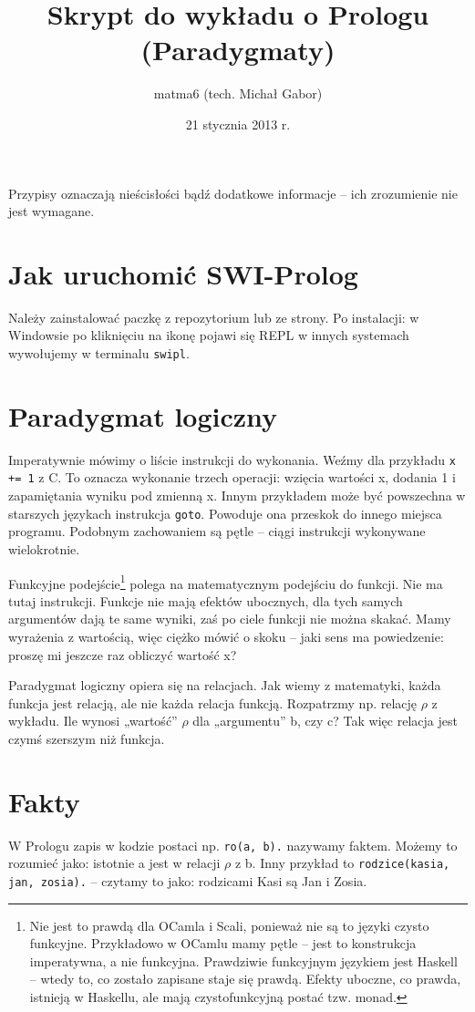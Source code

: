 \documentclass[12pt,a4paper]{article}
\author{matma6 (tech. Michał Gabor)}
\title{Skrypt do wykładu o Prologu (Paradygmaty)}
\date{21 stycznia 2013 r.}
\begin{document}
\maketitle
Przypisy oznaczają nieścisłości bądź dodatkowe informacje – ich zrozumienie nie jest wymagane.
\section{Jak uruchomić SWI-Prolog}
Należy zainstalować paczkę z repozytorium lub ze strony. Po instalacji:
w Windowsie po kliknięciu na ikonę pojawi się REPL
w innych systemach wywołujemy w terminalu \verb+swipl+.
\section{Paradygmat logiczny}
Imperatywnie mówimy o liście instrukcji do wykonania. Weźmy dla przykładu \verb!x += 1! z C. To oznacza wykonanie trzech operacji: wzięcia wartości x, dodania 1 i zapamiętania wyniku pod zmienną x. Innym przykładem może być powszechna w starszych językach instrukcja \verb!goto!. Powoduje ona przeskok do innego miejsca programu. Podobnym zachowaniem są pętle – ciągi instrukcji wykonywane wielokrotnie.

Funkcyjne podejście\footnote{Nie jest to prawdą dla OCamla i Scali, ponieważ nie są to języki czysto funkcyjne. Przykładowo w OCamlu mamy pętle – jest to konstrukcja imperatywna, a nie funkcyjna. Prawdziwie funkcyjnym językiem jest Haskell – wtedy to, co zostało zapisane staje się prawdą. Efekty uboczne, co prawda, istnieją w Haskellu, ale mają czystofunkcyjną postać tzw. monad.} polega na matematycznym podejściu do funkcji. Nie ma tutaj instrukcji. Funkcje nie mają efektów ubocznych, dla tych samych argumentów dają te same wyniki, zaś po ciele funkcji nie można skakać. Mamy wyrażenia z wartością, więc ciężko mówić o skoku – jaki sens ma powiedzenie: proszę mi jeszcze raz obliczyć wartość x?

Paradygmat logiczny opiera się na relacjach. Jak wiemy z matematyki, każda funkcja jest relacją, ale nie każda relacja funkcją. Rozpatrzmy np. relację $\rho$ z wykładu. Ile wynosi „wartość” $\rho$ dla „argumentu” b, czy c? Tak więc relacja jest czymś szerszym niż funkcja.

\section{Fakty}
W Prologu zapis w kodzie postaci np. \verb+ro(a, b).+ nazywamy faktem. Możemy to rozumieć jako: istotnie a jest w relacji $\rho$ z b. Inny przykład to \verb+rodzice(kasia, jan, zosia).+ – czytamy to jako: rodzicami Kasi są Jan i Zosia.
\end{document}
